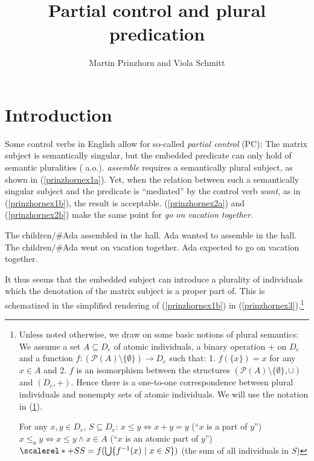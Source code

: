 \documentclass[output=paper,colorlinks,citecolor=brown,
]{langscibook}
\author{Martin Prinzhorn\affiliation{University of Vienna} and Viola Schmitt\affiliation{Humboldt University Berlin}\orcid{}}
\title{Partial control and plural predication}
\begin{document}
\maketitle

\section{Introduction}\label{prinzhornsec:1}

Some control verbs in English allow for so-called  {\it partial control} (PC): The matrix subject is semantically singular, but the embedded predicate can only hold of semantic pluralities (\cite{Wilkinson:1971, Landau:2000, Wurmbrand:2001, Wurmbrand:2002, Pearson:2016} a.o.). {\it assemble} requires a semantically plural subject, as shown in (\ref{prinzhornex1a}). Yet, when the relation between such a semantically singular subject and the predicate is “mediated” by the control verb {\it want}, as in (\ref{prinzhornex1b}), the result is acceptable. (\ref{prinzhornex2a}) and (\ref{prinzhornex2b}) make the same point for {\it go on vacation together}.

\ea  
\ea The children\slash\#Ada assembled in the hall. \label{prinzhornex1a}
\ex	Ada wanted to assemble in the hall. \hfill \citep[(1a)]{Pearson:2016} \label{prinzhornex1b}
\ex The children\slash\#Ada went on vacation together. \label{prinzhornex2a}
\ex Ada expected to go on vacation together. \hfill \citep[(1a)]{Pearson:2016} \label{prinzhornex2b}
\z\z
	
It thus seems that the embedded subject can introduce a plurality of individuals which the denotation of the matrix subject is a proper part of. This is schematized in the simplified rendering of (\ref{prinzhornex1b}) in (\ref{prinzhornex3}).\footnote{Unless noted otherwise, we draw on some basic notions of plural semantics: We assume a set $A \subseteq D_e$ of atomic individuals, a binary operation $+$ on $D_e$ and a function $f\colon (\mathcal{P}(A)\setminus \{\emptyset\}) \to D_e$ such that: 1. $f(\{x\}) = x$ for any $x \in A$ and 2. $f$ is an isomorphism between the structures $(\mathcal{P}(A)\setminus \{\emptyset\}, \cup)$ and $(D_e, +)$. Hence there is a one-to-one correspondence between plural individuals and nonempty sets of atomic individuals. We will use the notation in (\ref{prinzhornDD}).

\ea \label{prinzhornDD} For any $x, y \in D_e$, $S \subseteq D_e$:
\ea $x \leq y \Leftrightarrow x + y = y$ (``$x$ is a part of $y$'')
 \ex $x \leq_{a} y \Leftrightarrow x \leq y \land x \in A$ (``$x$ is an atomic part of $y$'')
\ex  $\scalerel*{+}{S}S = f(\bigcup\{f^{-1}(x)\ |\ x \in S\})$ (the sum of all individuals in $S$)
\z\z}
\end{document}
